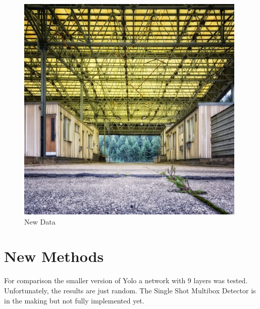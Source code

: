 \documentclass{article}
\begin{document}
\begin{figure}[h]
\begin{minipage}{0.24\textwidth}
			\includegraphics[width=\textwidth]{../fig/background}
		\end{minipage}
	\caption{New Data}
			\label{fig:background}
\end{figure}

\section{New Methods}

For comparison the smaller version of Yolo a network with 9 layers was tested. Unfortunately, the results are just random. The Single Shot Multibox Detector \cite{Liu} is in the making but not fully implemented yet.
\end{document}
